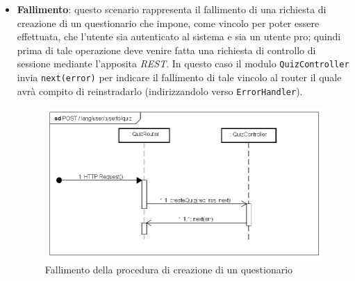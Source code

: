 \begin{itemize}
\item \textbf{Fallimento}: questo scenario rappresenta il fallimento di una richiesta di creazione di un questionario che impone, come vincolo per poter essere effettuata, che l'utente sia autenticato al sistema e sia un utente pro; quindi prima di tale operazione deve venire fatta una richiesta di controllo di sessione mediante l'apposita \textit{REST}. In questo caso il modulo \texttt{QuizController} invia \texttt{next(error)} per indicare il fallimento di tale vincolo al router il quale avrà compito di reinstradarlo (indirizzandolo verso \texttt{ErrorHandler}).
\label{Fallimento della procedura di creazione di un questionario}
\begin{figure}[ht]
	\centering
	\includegraphics[scale=0.40]{UML/DiagrammiDiSequenza/Back-end/POST__lang_user_userId_quiz_failure.png}
	\caption{Fallimento della procedura di creazione di un questionario}
\end{figure}
\FloatBarrier
\end{itemize}

